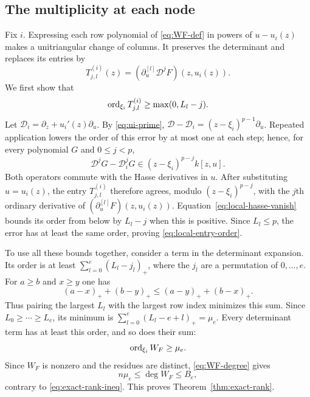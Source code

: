 \subsection{The multiplicity at each node}
Fix $i$. Expressing each row polynomial of \eqref{eq:WF-def} in powers of
$u-u_i(z)$ makes a unitriangular change of columns. It preserves the
determinant and replaces its entries by
\[
 T^{(i)}_{j,l}(z)=(\partial_u^{[l]}\mathcal D^jF)(z,u_i(z)).
\]
We first show that
\begin{equation}\label{eq:local-entry-order}
 \operatorname{ord}_{\xi_i}T^{(i)}_{j,l}\geq\max(0,L_l-j).
\end{equation}
Let $\mathcal D_i=\partial_z+u_i'(z)\partial_u$.
By \eqref{eq:ui-prime},
$\mathcal D-\mathcal D_i=(z-\xi_i)^{p-1}\partial_u$.
Repeated application lowers the order of this error by at most one at each
step; hence, for every polynomial $G$ and $0\leq j<p$,
\[
 \mathcal D^jG-\mathcal D_i^jG
       \in(z-\xi_i)^{p-j}k[z,u].
\]
Both operators commute with the Hasse derivatives in $u$.
After substituting $u=u_i(z)$, the entry $T^{(i)}_{j,l}$ therefore agrees,
modulo $(z-\xi_i)^{p-j}$, with the $j$th ordinary derivative of
$(\partial_u^{[l]}F)(z,u_i(z))$.
Equation~\eqref{eq:local-hasse-vanish} bounds its order from below by $L_l-j$ when
this is positive. Since $L_l\leq p$, the error has at least the same
order, proving \eqref{eq:local-entry-order}.

To use all these bounds together, consider a term in the determinant
expansion. Its order is at least
$\sum_{l=0}^e(L_l-j_l)_+$, where the $j_l$ are a permutation of
$0,\ldots,e$. For $a\geq b$ and $x\geq y$ one has
\[
 (a-x)_++(b-y)_+\leq(a-y)_++(b-x)_+.
\]
Thus pairing the largest $L_l$ with the largest row index minimizes this
sum. Since $L_0\geq\cdots\geq L_e$, its minimum is
$\sum_{l=0}^e(L_l-e+l)_+=\mu_e$.
Every determinant term has at least this order, and so does their sum:
\[
 \operatorname{ord}_{\xi_i}W_F\geq\mu_e.
\]
Since $W_F$ is nonzero and the residues are distinct, \eqref{eq:WF-degree} gives
\begingroup{}
\[
 n\mu_e\leq\deg W_F\leq B_e,
\]
\endgroup
contrary to \eqref{eq:exact-rank-ineq}. This proves Theorem~\ref{thm:exact-rank}.
